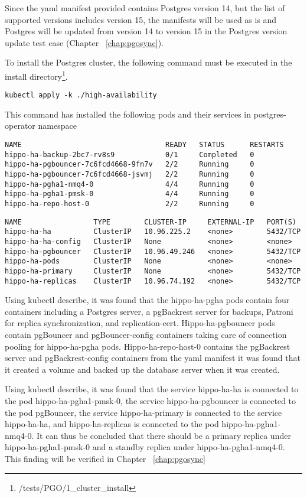 Since the yaml manifest provided contains Postgres version 14, but the list of supported versions includes version 15, the manifests will be used as is and Postgres will be updated from version 14 to version 15 in the Postgres version update test case (Chapter ~\ref{chap:pgosync}).

To install the Postgres cluster, the following command must be executed in the install directory\footnote{/tests/PGO/1\_cluster\_install}.
\begin{verbatim}
kubectl apply -k ./high-availability
\end{verbatim}

This command has installed the following pods and their services in postgres-operator namespace

\begin{verbatim}
NAME                                  READY   STATUS      RESTARTS
hippo-ha-backup-2bc7-rv8s9            0/1     Completed   0
hippo-ha-pgbouncer-7c6fcd4668-9fn7v   2/2     Running     0
hippo-ha-pgbouncer-7c6fcd4668-jsvmj   2/2     Running     0
hippo-ha-pgha1-nmq4-0                 4/4     Running     0
hippo-ha-pgha1-pmsk-0                 4/4     Running     0
hippo-ha-repo-host-0                  2/2     Running     0
\end{verbatim}

\begin{verbatim}
NAME                 TYPE        CLUSTER-IP     EXTERNAL-IP   PORT(S)
hippo-ha-ha          ClusterIP   10.96.225.2    <none>        5432/TCP
hippo-ha-ha-config   ClusterIP   None           <none>        <none>
hippo-ha-pgbouncer   ClusterIP   10.96.49.246   <none>        5432/TCP
hippo-ha-pods        ClusterIP   None           <none>        <none>
hippo-ha-primary     ClusterIP   None           <none>        5432/TCP
hippo-ha-replicas    ClusterIP   10.96.74.192   <none>        5432/TCP
\end{verbatim}

Using kubectl describe, it was found that the hippo-ha-pgha pods contain four containers including a Postgres server, a pgBackrest server for backups, Patroni for replica synchronization, and replication-cert. Hippo-ha-pgbouncer pods contain pgBouncer and pgBouncer-config containers taking care of connection pooling for hippo-ha-pgha pods. Hippo-ha-repo-host-0 contains the pgBackrest server and pgBackrest-config containers from the yaml manifest it was found that it created a volume and backed up the database server when it was created.

Using kubectl describe, it was found that the service hippo-ha-ha is connected to the pod hippo-ha-pgha1-pmsk-0, the service hippo-ha-pgbouncer is connected to the pod pgBouncer, the service hippo-ha-primary is connected to the service hippo-ha-ha, and hippo-ha-replicas is connected to the pod hippo-ha-pgha1-nmq4-0. It can thus be concluded that there should be a primary replica under hippo-ha-pgha1-pmsk-0 and a standby replica under hippo-ha-pgha1-nmq4-0. This finding will be verified in Chapter ~\ref{chap:pgosync}


